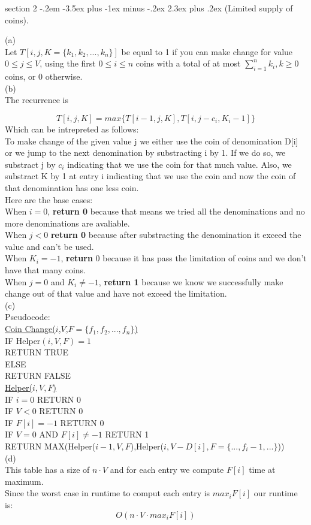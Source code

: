 \documentclass{article}
\makeatletter
\newenvironment{problem}{\@startsection
       {section}
       {2}
       {-.2em}
       {-3.5ex plus -1ex minus -.2ex}
       {2.3ex plus .2ex}
       {\pagebreak[3]%
       \large\bf\noindent{Problem }
       }
       }
\makeatother
\begin{document}
\newpage

\begin{problem}{(Limited supply of coins).}

(a)\\
Let \(T[i, j, K=\{k_1,k_2,...,k_n\}]\) be equal to 1 if you can make change for value \(0\leq j\leq V\), using the first \(0\leq i\leq n\) coins with a total of at most \(\sum_{i=1}^{n}k_i,k\geq 0\) coins, or 0 otherwise.\\
(b)\\
The recurrence is 

\[T[i,j,K]=max\{T[i-1,j,K],T[i,j-c_i,K_i-1]\}\]
Which can be intrepreted as follows:\\
To make change of the given value j we either use the coin of denomination D[i] or we jump to the next denomination by substracting i by 1.
If we do so, we substract j by \(c_i\) indicating that we use the coin for that much value. Also, we substract K by 1 at entry i indicating that we use the coin and now the coin of that denomination has one less coin.\\
Here are the base cases:\\
When \(i=0\), \textbf{return 0} because that means we tried all the denominations and no more denominations are avaliable.\\
When \(j<0\) \textbf{return 0} because after substracting the denomination it exceed the value and can't be used.\\
When \(K_i=-1\), \textbf{return} 0 because it has pass the limitation of coins and we don't have that many coins.\\ 
When \(j=0\) and \(K_i\neq-1\), \textbf{return 1} because we know we successfully make change out of that value and have not exceed the limitation.\\
(c)\\
Pseudocode:\\
\underline{Coin Change(\(i\),\(V\),\(F=\{f_1,f_2,...,f_n\}\))}\\
IF Helper\((i,V,F)=1\) \\
RETURN TRUE\\
ELSE \\
RETURN FALSE\\
\underline{Helper(\(i,V,F\))}\\
IF \(i=0\) RETURN 0\\
IF \(V<0\) RETURN 0\\
IF \(F[i]=-1\) RETURN 0\\
IF \(V=0\) AND \(F[i]\neq-1\) RETURN 1\\
RETURN MAX(Helper(\(i-1,V,F\)),Helper(\(i,V-D[i],F=\{...,f_i-1,...\}\)))\\
(d)\\
This table has a size of \(n \cdot V \) and for each entry we compute \(F[i]\) time at maximum.\\
Since the worst case in runtime to comput each entry is \(max_i F[i]\) our runtime is:\\
\[O(n\cdot V\cdot max_i F[i])\]



\end{problem}
\end{document}
